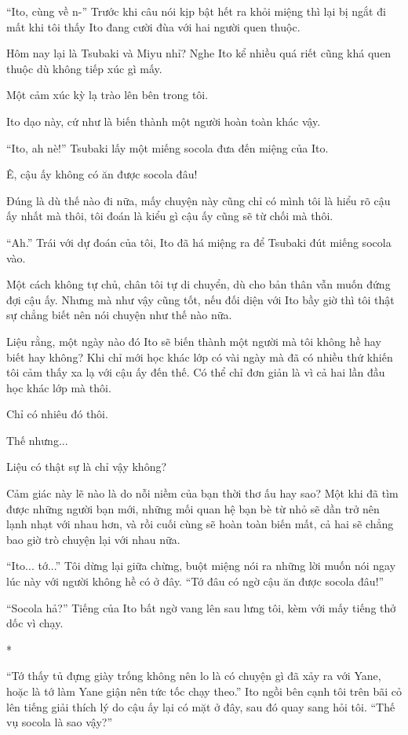 {``Ito, cùng về n-'' Trước khi câu nói kịp bật hết ra khỏi miệng thì lại
bị ngắt đi mất khi tôi thấy Ito đang cười đùa với hai người quen thuộc.

Hôm nay lại là Tsubaki và Miyu nhỉ? Nghe Ito kể nhiều quá riết cũng khá
quen thuộc dù không tiếp xúc gì mấy.

Một cảm xúc kỳ lạ trào lên bên trong tôi.

Ito dạo này, cứ như là biến thành một người hoàn toàn khác vậy.

``Ito, ah nè!'' Tsubaki lấy một miếng socola đưa đến miệng của Ito.

Ê, cậu ấy không có ăn được socola đâu!

Đúng là dù thế nào đi nữa, mấy chuyện này cũng chỉ có mình tôi là hiểu
rõ cậu ấy nhất mà thôi, tôi đoán là kiểu gì cậu ấy cũng sẽ từ chối mà
thôi.

``Ah.'' Trái với dự đoán của tôi, Ito đã há miệng ra để Tsubaki đút
miếng socola vào.

Một cách không tự chủ, chân tôi tự di chuyển, dù cho bản thân vẫn muốn
đứng đợi cậu ấy. Nhưng mà như vậy cũng tốt, nếu đối diện với Ito bầy giờ
thì tôi thật sự chẳng biết nên nói chuyện như thế nào nữa.

Liệu rằng, một ngày nào đó Ito sẽ biến thành một người mà tôi không hề
hay biết hay không? Khi chỉ mới học khác lớp có vài ngày mà đã có nhiều
thứ khiến tôi cảm thấy xa lạ với cậu ấy đến thế. Có thể chỉ đơn giản là
vì cả hai lần đầu học khác lớp mà thôi.

Chỉ có nhiêu đó thôi.

Thế nhưng...

Liệu có thật sự là chỉ vậy không?

Cảm giác này lẽ nào là do nỗi niềm của bạn thời thơ ấu hay sao? Một khi
đã tìm được những người bạn mới, những mối quan hệ bạn bè từ nhỏ sẽ dần
trở nên lạnh nhạt với nhau hơn, và rồi cuối cùng sẽ hoàn toàn biến mất,
cả hai sẽ chẳng bao giờ trò chuyện lại với nhau nữa.

``Ito... tớ...'' Tôi dừng lại giữa chừng, buột miệng nói ra những lời
muốn nói ngay lúc này với người không hề có ở đây. ``Tớ đâu có ngờ cậu
ăn được socola đâu!''

``Socola hả?'' Tiếng của Ito bất ngờ vang lên sau lưng tôi, kèm với mấy
tiếng thở dốc vì chạy.

*

``Tớ thấy tủ đựng giày trống không nên lo là có chuyện gì đã xảy ra với
Yane, hoặc là tớ làm Yane giận nên tức tốc chạy theo.'' Ito ngồi bên
cạnh tôi trên bãi cỏ lên tiếng giải thích lý do cậu ấy lại có mặt ở đây,
sau đó quay sang hỏi tôi. ``Thế vụ socola là sao vậy?''

}

